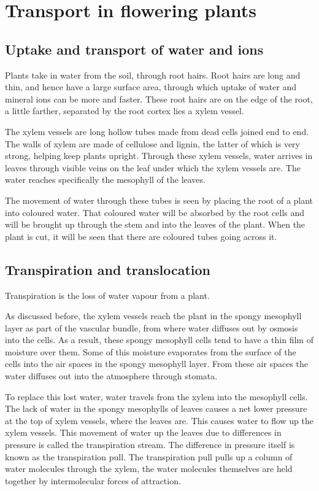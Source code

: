 \section{Transport in flowering plants}
\subsection{Uptake and transport of water and ions}

Plants take in water from the soil, through root hairs. Root hairs are long and thin, and hence
have a large surface area, through which uptake of water and mineral ions can be more and faster.
These root hairs are on the edge of the root, a little farther, separated by the root cortex lies
a xylem vessel.

The xylem vessels are long hollow tubes made from dead cells joined end to end. The walls of xylem
are made of cellulose and lignin, the latter of which is very strong, helping keep plants upright.
Through these xylem vessels, water arrives in leaves through visible veins on the leaf under which
the xylem vessels are. The water reaches specifically the mesophyll of the leaves.

The movement of water through these tubes is seen by placing the root of a plant into coloured
water. That coloured water will be absorbed by the root cells and will be brought up through the
stem and into the leaves of the plant. When the plant is cut, it will be seen that there are coloured
tubes going across it.

\subsection{Transpiration and translocation}

Transpiration is the loss of water vapour from a plant.

As discussed before, the xylem vessels reach the plant in the spongy mesophyll layer as part of
the vascular bundle, from where
water diffuses out by osmosis into the cells. As a result, these spongy mesophyll cells tend to
have a thin film of moisture over them. Some of this moisture evaporates from the surface of the
cells into the air spaces in the spongy mesophyll layer. From these air spaces the water diffuses
out into the atmosphere through stomata. 

To replace this lost water, water travels
from the xylem into the mesophyll cells. The lack of water in the spongy mesophylls of leaves 
causes a net lower pressure at the top of xylem vessels, where the leaves are. This causes water
to flow up the xylem vessels. This movement of water up the leaves due to differences in pressure
is called the transpiration stream. The difference in pressure itself is known as the transpiration
pull. The transpiration pull pulls up a column of water molecules through the xylem, the water
molecules themselves are held together by intermolecular forces of attraction.

